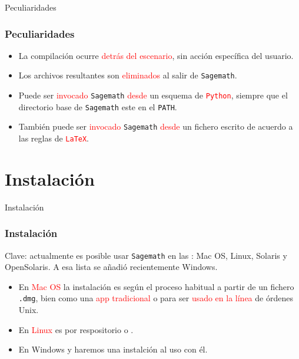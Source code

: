 \documentclass[dvipsnames]{beamer}
\begin{document}
\begin{frame}[fragile]{Peculiaridades}
  \frametitle{Peculiaridades}
  \begin{itemize}[<+->]
  \item La compilación ocurre \textcolor{red}{detrás del escenario},
    sin acción específica del usuario.
  \item Los archivos resultantes son \textcolor{red}{eliminados} al
    salir de \texttt{Sagemath}.
  \item Puede ser \textcolor{red}{invocado} \texttt{Sagemath} \textcolor{red}{desde} un
    esquema de \textcolor{red}{\texttt{Python}}, siempre que el directorio base de
    \texttt{Sagemath} este en el \texttt{PATH}.
  \item También puede ser \textcolor{red}{invocado} \texttt{Sagemath}
    \textcolor{red}{desde} un fichero escrito de acuerdo a las reglas
    de \textcolor{red}{\texttt{\LaTeX}}.
  \end{itemize}
\end{frame}

\section{Instalación}

\begin{frame}[fragile]{Instalación}
  \frametitle{Instalación}
  \begin{block}{Clave: actualmente es posible usar \texttt{Sagemath}
      en las
      :}
    Mac OS, Linux, Solaris y OpenSolaris. A esa lista se añadió
    recientemente Windows.
  \end{block}\pause 
  \begin{itemize}[<+->]
  \item En \textcolor{red}{Mac OS} la instalación es según el proceso
    habitual a partir de un fichero \texttt{.dmg}, bien como una \textcolor{red}{app
    tradicional} o para ser \textcolor{red}{usado en la línea} de órdenes Unix.
  \item En \textcolor{red}{Linux} es por respositorio
    o
    .
  \item En Windows  y
    haremos una instalción al uso con él.
  \end{itemize}
\end{frame}
\end{document}
